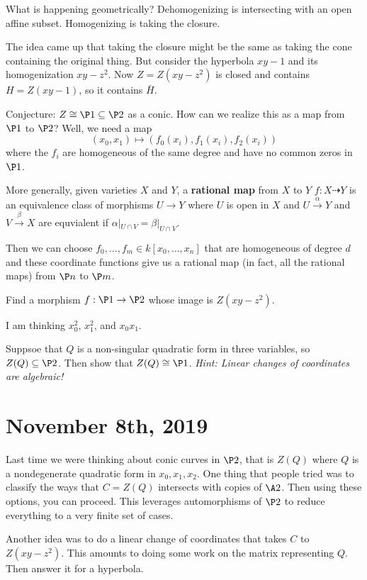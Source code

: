\documentclass[12pt]{article}
\begin{document}
What is happening geometrically? Dehomogenizing is intersecting with an open affine subset. Homogenizing is taking the closure.
\begin{rmk}
	The idea came up that taking the closure might be the same as taking the cone containing the original thing. But consider 
	the hyperbola $xy-1$ and its homogenization $xy-z^2$. Now $Z=Z(xy-z^2)$ is closed and contains $H=Z(xy-1)$, so it contains $\bar H$.

	Conjecture: $Z\cong \P1\subseteq\P2$ as a conic. How can we realize this as a map from $\P1$ to $\P2$? Well,
	we need a map 
	\[(x_0,x_1)\mapsto(f_0(x_i),f_1(x_i),f_2(x_i))\]
	where the $f_i$ are homogeneous of the same degree and have no common zeros in $\P1$.
\end{rmk}
\begin{rmk}
	More generally, given varieties $X$ and $Y$, a \textbf{rational map} from $X$ to $Y$ $f:X\dashrightarrow Y$ is an equivalence class of morphisms $U\to Y$ where $U$ is open in $X$ 
	and $U\xrightarrow{\alpha} Y$ and $V\xrightarrow{\beta}X$ are equvialent if $\alpha|_{U\cap V}=\beta|_{U\cap V}$.

	Then we can choose $f_0,\dots,f_m\in k[x_0,\dots,x_n]$ that are homogeneous of degree $d$ and these coordinate functions give us a rational map (in fact, all the rational maps) from $\P n$ to $\P m$.
\end{rmk}
\begin{prob}
	Find a morphism $f:\P1\to\P2$ whose image is $Z(xy-z^2)$.
\end{prob}
I am thinking $x_0^2$, $x_1^2$, and $x_0x_1$.
\begin{prob}
	Suppsoe that $Q$ is a non-singular quadratic form in three variables, so $Z(Q)\subseteq \P2$. Then show that $Z(Q)\cong \P1$.
	\textit{Hint: Linear changes of coordinates are algebraic!}
\end{prob}

\section{November 8th, 2019}
Last time we were thinking about conic curves in $\P2$, that is $Z(Q)$ where $Q$ is a nondegenerate quadratic form in $x_0,x_1,x_2$. One thing that people tried 
was to classify the ways that $C=Z(Q)$ intersects with copies of $\A2$. Then using these options, you can proceed. This leverages automorphisms of 
$\P2$ to reduce everything to a very finite set of cases.

Another idea was to do a linear change of coordinates that takes $C$ to $Z(xy-z^2)$. This amounts to doing some work on the matrix representing $Q$. Then answer it for a hyperbola. 
\end{document}
